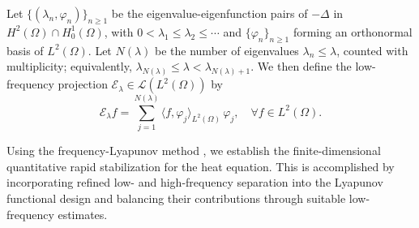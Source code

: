 \documentclass[a4paper]{article}
\numberwithin{equation}{section}
\begin{document}
Let $\{(\lambda_n,\varphi_n)\}_{n\ge1}$ be the eigenvalue-eigenfunction pairs of $-\Delta$ in $H^2(\Omega)\cap H^1_0(\Omega)$, with $0<\lambda_1\le \lambda_2\le \cdots$ and $\{\varphi_n\}_{n\ge1}$ forming an orthonormal basis of $L^2(\Omega)$. Let $N(\lambda)$ be the number of eigenvalues $\lambda_n \le \lambda$, counted with multiplicity; equivalently, $\lambda_{N(\lambda)} \le \lambda < \lambda_{N(\lambda)+1}$. We then define the low-frequency projection $\mathcal{E}_\lambda\in\mathcal L(L^2(\Omega))$ by
\begin{equation}\label{low-fre-pro}
\mathcal{E}_\lambda f=\sum_{j=1}^{N(\lambda)} \langle f,\varphi_j\rangle_{L^2(\Omega)}\,\varphi_j,\quad \forall f\in L^2(\Omega).
\end{equation}

Using the frequency-Lyapunov method \cite{X2,XZ}, we establish the finite-dimensional quantitative rapid stabilization for the heat equation. This is accomplished by incorporating refined low- and high-frequency separation into the Lyapunov functional design and balancing their contributions through suitable low-frequency estimates.
\end{document}
